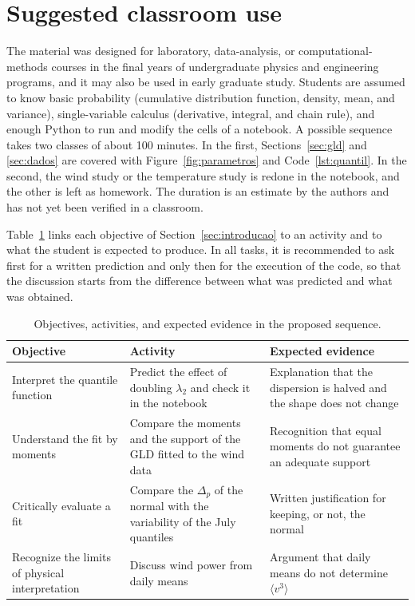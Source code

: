 
\section{Suggested classroom use}\label{sec:roteiro}

The material was designed for laboratory, data-analysis, or computational-methods courses in the final years of undergraduate physics and engineering programs, and it may also be used in early graduate study. Students are assumed to know basic probability (cumulative distribution function, density, mean, and variance), single-variable calculus (derivative, integral, and chain rule), and enough Python to run and modify the cells of a notebook. A possible sequence takes two classes of about 100 minutes. In the first, Sections~\ref{sec:gld} and \ref{sec:dados} are covered with Figure~\ref{fig:parametros} and Code~\ref{lst:quantil}. In the second, the wind study or the temperature study is redone in the notebook, and the other is left as homework. The duration is an estimate by the authors and has not yet been verified in a classroom.

Table~\ref{tab:roteiro} links each objective of Section~\ref{sec:introducao} to an activity and to what the student is expected to produce. In all tasks, it is recommended to ask first for a written prediction and only then for the execution of the code, so that the discussion starts from the difference between what was predicted and what was obtained.

\begin{table}[htbp]
\centering
\caption{Objectives, activities, and expected evidence in the proposed sequence.}
\label{tab:roteiro}
\small
\begin{tabular}{p{3.6cm} p{5.4cm} p{5.0cm}}
\toprule
\textbf{Objective} & \textbf{Activity} & \textbf{Expected evidence} \\
\midrule
Interpret the quantile function & Predict the effect of doubling $\lambda_2$ and check it in the notebook & Explanation that the dispersion is halved and the shape does not change \\
Understand the fit by moments & Compare the moments and the support of the GLD fitted to the wind data & Recognition that equal moments do not guarantee an adequate support \\
Critically evaluate a fit & Compare the $\Delta_p$ of the normal with the variability of the July quantiles & Written justification for keeping, or not, the normal \\
Recognize the limits of physical interpretation & Discuss wind power from daily means & Argument that daily means do not determine $\langle v^3\rangle$ \\
\bottomrule
\end{tabular}
\end{table}

